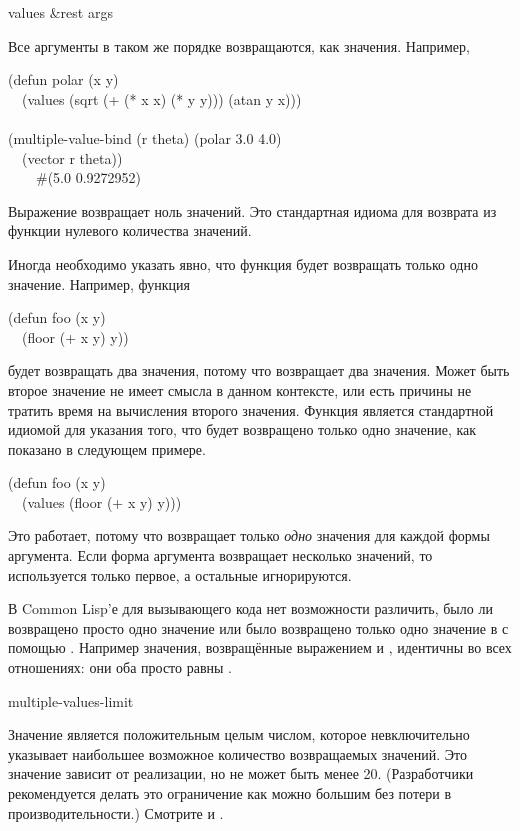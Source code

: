 \begin{defun}[Function]
values &rest args

Все аргументы в таком же порядке возвращаются, как значения.
Например,
\begin{lisp}
(defun polar (x y) \\
~~(values (sqrt (+ (* x x) (* y y))) (atan y x))) \\
 \\
(multiple-value-bind (r theta) (polar 3.0 4.0) \\
~~(vector r theta)) \\
~~~\EV\ \#(5.0 0.9272952)
\end{lisp}

Выражение  возвращает ноль значений. Это стандартная идиома для
возврата из функции нулевого количества значений.

Иногда необходимо указать явно, что функция будет возвращать только одно
значение. Например, функция
\begin{lisp}
(defun foo (x y) \\
~~(floor (+ x y) y))
\end{lisp}
будет возвращать два значения, потому что  возвращает два
значения. Может быть второе значение не имеет смысла в данном контексте, или
есть причины не тратить время на вычисления второго значения. Функция
 является стандартной идиомой для указания того, что будет
возвращено только одно значение, как показано в следующем примере.
\begin{lisp}
(defun foo (x y) \\
~~(values (floor (+ x y) y)))
\end{lisp}
Это работает, потому что  возвращает только \emph{одно} значения для
каждой формы аргумента. Если форма аргумента возвращает несколько значений, то
используется только первое, а остальные игнорируются.

В Common Lisp'е для вызывающего кода нет возможности различить, было ли
возвращено просто одно значение или было возвращено только одно значение в с
помощью . Например значения, возвращённые выражением  и 
, идентичны во всех отношениях: они оба просто равны .
\end{defun}

\begin{defun}[Constant]
multiple-values-limit

Значение  является положительным целым числом,
которое невключительно указывает наибольшее возможное количество возвращаемых
значений. Это значение зависит от реализации, но не может быть менее 20.
(Разработчики рекомендуется делать это ограничение как можно большим без потери
в производительности.)
Смотрите  и .
\end{defun}

